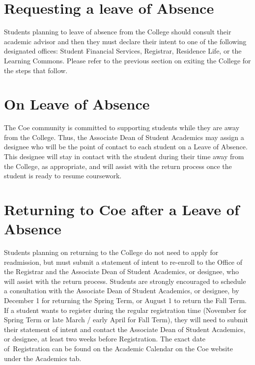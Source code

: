 \documentclass[
  letterpaper,
]{scrbook}
\begin{document}
\hypertarget{requesting-a-leave-of-absence}{%
\section{Requesting a leave of
Absence}\label{requesting-a-leave-of-absence}}

Students planning to leave of absence from the College should consult
their academic advisor and then they must declare their intent to one of
the following designated offices: Student Financial Services, Registrar,
Residence Life, or the Learning Commons. Please refer to the previous
section on exiting the College for the steps that follow.~

\hypertarget{on-leave-of-absence}{%
\section{On Leave of Absence}\label{on-leave-of-absence}}

The Coe community is committed to supporting students while they are
away from the College. Thus, the Associate Dean of Student Academics may
assign a designee who will be the point of contact to each student on a
Leave of Absence. This designee will stay in contact with the student
during their time away from the College, as appropriate, and will assist
with the return process once the student is ready to resume coursework.~

\hypertarget{returning-to-coe-after-a-leave-of-absence}{%
\section{Returning to Coe after a Leave of
Absence}\label{returning-to-coe-after-a-leave-of-absence}}

Students planning on returning to the College do not need to apply for
readmission, but must submit a statement of intent to re-enroll to the
Office of the Registrar and the Associate Dean of Student Academics, or
designee, who will assist with the return process. Students are strongly
encouraged to schedule a consultation with the Associate Dean of Student
Academics, or designee, by December 1 for returning the Spring Term, or
August 1 to return the Fall Term. If a student wants to register during
the regular registration time (November for Spring Term or late March /
early April for Fall Term), they will need to submit their statement of
intent and contact the Associate Dean of Student Academics, or designee,
at least two weeks before Registration. The exact date of~Registration
can be found on the Academic Calendar on the Coe website under the
Academics tab.~
\end{document}
